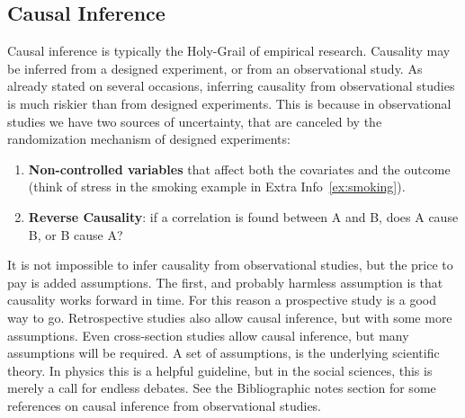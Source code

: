 \subsection{Causal Inference}
\label{sec:causal}

Causal inference is typically the Holy-Grail of empirical research. 
Causality may be inferred from a designed experiment, or from an observational study. 
As already stated on several occasions, inferring causality from observational studies is much riskier than from designed experiments. 
This is because in observational studies we have two sources of uncertainty, that are canceled by the randomization mechanism of designed experiments:
\begin{enumerate}
	\item \textbf{Non-controlled variables} that affect both the covariates and the outcome (think of stress in the smoking example in Extra Info~\ref{ex:smoking}).
	\item \textbf{Reverse Causality}: if a correlation is found between A and B, does A cause B, or B cause A?
\end{enumerate}
It is not impossible to infer causality from observational studies, but the price to pay is added assumptions.
The first, and probably harmless assumption is that causality works forward in time. 
For this reason a prospective study is a good way to go. 
Retrospective studies also allow causal inference, but with some more assumptions.
Even cross-section studies allow causal inference, but many assumptions will be required.
A set of assumptions, is the underlying scientific theory. 
In physics this is a helpful guideline, but in the social sciences, this is merely a call for endless debates. 
See the Bibliographic notes section for some references on causal inference from observational studies. 









